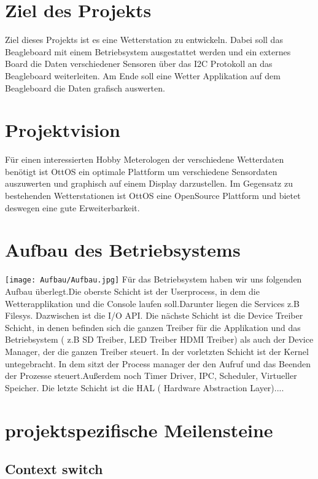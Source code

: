 \documentclass[10pt,a4paper]{article}
\begin{document}
\section{Ziel des Projekts}
 Ziel dieses Projekts ist es eine Wetterstation zu entwickeln. Dabei soll das Beagleboard mit einem Betriebsystem ausgestattet werden und ein externes Board die Daten verschiedener Sensoren über das I2C Protokoll an das Beagleboard weiterleiten. Am Ende soll eine Wetter Applikation auf dem Beagleboard die Daten grafisch auswerten.
\newpage

\section{Projektvision}
Für einen interessierten Hobby Meterologen der verschiedene Wetterdaten benötigt ist OttOS ein optimale Plattform um verschiedene Sensordaten auszuwerten und graphisch auf einem Display darzustellen. Im Gegensatz zu bestehenden Wetterstationen ist OttOS eine OpenSource Plattform und bietet deswegen eine gute Erweiterbarkeit.
\newpage

\section{Aufbau des Betriebsystems}
\texttt{[image: Aufbau/Aufbau.jpg]}\linebreak \linebreak
Für das Betriebsystem haben wir uns folgenden Aufbau überlegt.Die oberste Schicht ist der Userprocess, in dem die Wetterapplikation und die Console laufen soll.Darunter liegen die Services z.B Filesys. Dazwischen ist die I/O API. Die nächste Schicht ist die Device Treiber Schicht, in denen befinden sich die ganzen Treiber für die Applikation und das Betriebsystem ( z.B SD Treiber, LED Treiber HDMI Treiber) als auch der Device Manager, der die ganzen Treiber steuert. In der vorletzten Schicht ist der Kernel untegebracht. In dem sitzt der Process manager der den Aufruf und das Beenden der Prozesse steuert.Außerdem noch Timer Driver, IPC, Scheduler, Virtueller Speicher. Die letzte Schicht ist die HAL ( Hardware Abstraction Layer)....


\section{projektspezifische Meilensteine}

\subsection{Context switch}
\newpage
\end{document}
